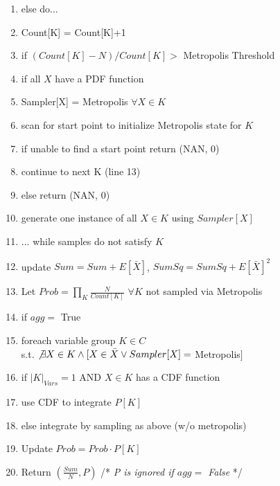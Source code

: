 \begin{algorithm}
\begin{enumerate}
\item \hspace*{0.3in} else do...
\item \hspace*{0.4in} Count[K] = Count[K]+1
\item \hspace*{0.4in} if $(Count[K]-N)/Count[K] >$ Metropolis Threshold
\item \hspace*{0.5in} if all $X$ have a PDF function
\item \hspace*{0.6in} Sampler[X] = Metropolis $\forall X \in K$
\item \hspace*{0.6in} scan for start point to initialize Metropolis state for $K$ 
\item \hspace*{0.6in} if unable to find a start point return (NAN, 0)
\item \hspace*{0.6in} continue to next K (line 13)
\item \hspace*{0.5in} else return (NAN, 0)
\item \hspace*{0.4in} generate one instance of all $X \in K$ using $Sampler[X]$
\item \hspace*{0.3in} ... while samples do not satisfy $K$
\item \hspace*{0.2in} update $Sum = Sum + E[\bar X]$, $SumSq = SumSq + E[\bar X]^2$
\item \hspace*{0.1in} Let $Prob = \prod_K \frac{N}{Count[K]}$ $\forall K$ not sampled via Metropolis
\item \hspace*{0.1in} if $agg =$ True
\item \hspace*{0.2in} foreach variable group $K \in C$ \\ \hspace*{0.5in}s.t. $\not\exists X \in K \wedge [X \in \bar X \vee Sampler[X] =$ Metropolis$]$ 
\item \hspace*{0.3in} if $|K|_{Vars} = 1$ AND $X\in K$ has a CDF function
\item \hspace*{0.4in} use CDF to integrate $P[K]$
\item \hspace*{0.3in} else integrate by sampling as above (w/o metropolis)
\item \hspace*{0.3in} Update $Prob = Prob \cdot P[K]$
\item \hspace*{0.1in} Return $(\frac{Sum}{N}, P)$ /* \textit{P is ignored if $agg =$ False} */
\end{enumerate}
\end{algorithm}%



